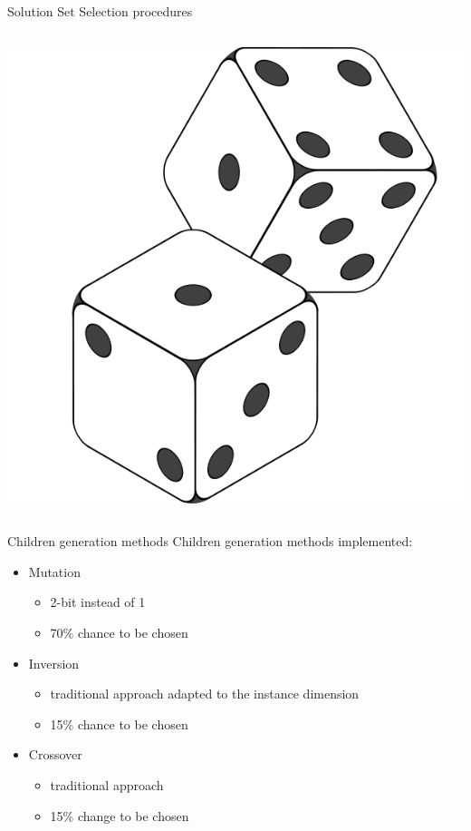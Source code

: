 \documentclass[12pt]{beamer}
\begin{document}
\begin{frame}[fragile]{Solution Set Selection procedures}
\begin{columns}
\begin{column}{0.5\textwidth}
{            \includegraphics[scale=0.15]{res/Random}
          }
      \end{column}
    \end{columns}
  \end{frame}

  \begin{frame}[fragile]{Children generation methods}
    Children generation methods implemented:
    \begin{itemize}
      \item Mutation
      \begin{itemize}
        \item 2-bit instead of 1
        \item 70\% chance to be chosen
      \end{itemize}
      \item Inversion
      \begin{itemize}
        \item traditional approach adapted to the instance dimension
        \item 15\% chance to be chosen
      \end{itemize}
      \item Crossover
       \begin{itemize}
        \item traditional approach
        \item 15\% change to be chosen
      \end{itemize}
    \end{itemize}
  \end{frame}
\end{document}
